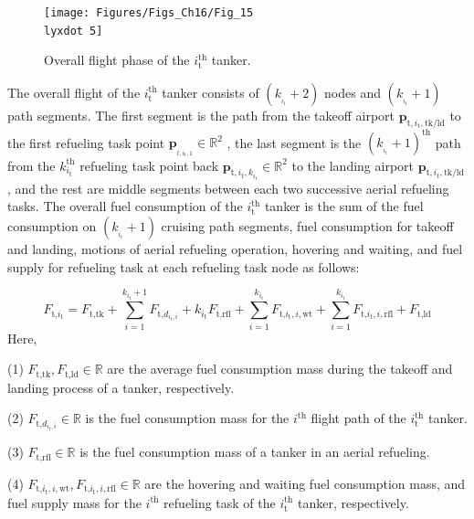 \begin{figure}
	\begin{centering}
		\texttt{[image: Figures/Figs\_Ch16/Fig\_15\\lyxdot 5]}
		\par\end{centering}
	\caption{Overall flight phase of the  $i_{\text{t}}^{\text{th}}$ tanker.}
	\centering{}\label{Fig_15.5}
\end{figure}

The overall flight of the $i_{\text{t}}^{\text{th}}$  tanker consists of  $(k_{_{i_\text{t}}}+2)$ nodes and $(k_{_{i_\text{t}}}+1)$  path segments. The first segment is the path from the takeoff airport $\mathbf{p}_{\text{t},i_\text{t},\text{tk}/\text{ld}}$  to the first refueling task point $\mathbf{p}_{_{t,i_\text{t},1}}\in\mathbb{R}^{2}$ , the last segment is the $(k_{_{i_\text{t}}}+1)^\text{th}$ path from the $k_{i_{\text{t}}}^{\text{th}}$  refueling task point back $\mathbf{p}_{\text{t},i_\text{t},k_{i_\text{t}}}\in\mathbb{R}^2$ to the landing airport $\mathbf{p}_{\text{t},i_\text{t},\text{tk}/\text{ld}}$ , and the rest are middle segments between each two successive aerial refueling tasks. The overall fuel consumption of the $i_{\text{t}}^{\text{th}}$  tanker is the sum of the fuel consumption on $(k_{_{i_\text{t}}}+1)$  cruising path segments, fuel consumption for takeoff and landing, motions of aerial refueling operation, hovering and waiting, and fuel supply for refueling task at each refueling task node as follows:

\begin{equation}
F_{\text{t,}i_\text{t}}=F_\text{t,tk}+\sum_{i=1}^{k_{i_\text{t}}+1}F_{\text{t,}d_{i_\text{t},i}}+k_{i_\text{t}}F_{\text{t,rfl}}+\sum_{i=1}^{k_{i_\text{t}}}F_{\text{t,}i_\text{t},i,\text{wt}}+\sum_{i=1}^{k_{i_\text{t}}}F_{\text{t,}i_\text{t},i,\text{rfl}}+F_{\text{t,ld}}
\label{eq:15.23}
\end{equation}
Here,

(1)	$F_\text{t,tk},F_\text{t,ld}\in\mathbb{R}$  are the average fuel consumption mass during the takeoff and landing process of a tanker, respectively.

(2)	$F_{\text{t,}d_{i_\text{t},i}}\in\mathbb{R}$  is the fuel consumption mass for the $i_{}^{\text{th}}$ flight path of the $i_{\text{t}}^{\text{th}}$ tanker.

(3)	$F_\text{t,rfl}\in\mathbb{R}$  is the fuel consumption mass of a tanker in an aerial refueling.

(4)  $F_{\text{t,}i_\text{t},i,\text{wt}},F_{\text{t,}i_\text{t},i,\text{rfl}}\in\mathbb{R}$ are the hovering and waiting fuel consumption mass, and fuel supply mass for the $i_{}^{\text{th}}$ refueling task of the $i_{\text{t}}^{\text{th}}$  tanker, respectively.

